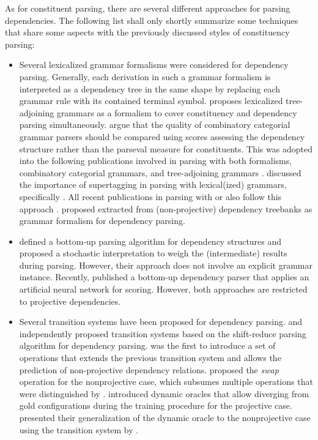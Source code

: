 \documentclass[../document.tex]{subfiles}
\begin{document}
    As for constituent parsing, there are several different approaches for parsing dependencies.
    The following list shall only shortly summarize some techniques that share some aspects with the previously discussed styles of constituency parsing:
    \begin{itemize}
        \item Several lexicalized grammar formalisms were considered for dependency parsing. Generally, each derivation in such a grammar formalism is interpreted as a dependency tree in the same shape by replacing each grammar rule with its contained terminal symbol. \citet{chiang2000statistical} proposes lexicalized tree-adjoining grammars as a formalism to cover constituency and dependency parsing simultaneously. \citet{hockenmaier2002generative} argue that the quality of combinatory categorial grammar parsers should be compared using scores assessing the dependency structure rather than the parseval measure for constituents. This was adopted into the following publications involved in parsing with both formalisms, combinatory categorial grammars, and tree-adjoining grammars \citep{Kas17,Bla18}. \citet{Clark04} discussed the importance of supertagging in parsing with lexical(ized) grammars, specifically . All recent publications in parsing with  or  also follow this approach \citep{Kas17,LewisSteedman14}.
         proposed  extracted from (non-projective) dependency treebanks as grammar formalism for dependency parsing.
        \item \citet{eisner-1996-three} defined a bottom-up parsing algorithm for dependency structures and proposed a stochastic interpretation to weigh the (intermediate) results during parsing. However, their approach does not involve an explicit grammar instance. Recently, \citet{yang-tu-2022-headed} published a bottom-up dependency parser that applies an artificial neural network for scoring. However, both approaches are restricted to projective dependencies.
        \item Several transition systems have been proposed for dependency parsing. \citet{nivre-2003-efficient} and \citet{yamada-matsumoto-2003-statistical} independently proposed transition systems based on the shift-reduce parsing algorithm for dependency parsing. \citet{attardi-2006-experiments} was the first to introduce a set of operations that extends the previous transition system and allows the prediction of non-projective dependency relations. \citet{Nivre09} proposed the \emph{swap} operation for the nonprojective case, which subsumes multiple operations that were distinguished by \citet{attardi-2006-experiments}. \citet{Goldberg12} introduced dynamic oracles that allow diverging from gold configurations during the training procedure for the projective case. \citet{gomez2014polynomial} presented their generalization of the dynamic oracle to the nonprojective case using the transition system by \citet{attardi-2006-experiments}.
    \end{itemize}
\end{document}
